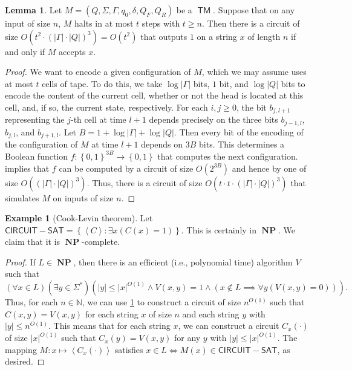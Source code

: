 \documentclass[10pt,letterpaper,cm]{nupset}
\theoremstyle{definition}
\newtheorem{exmp}[definition]{Example}
\theoremstyle{theorem}
\newtheorem{lemma}[definition]{Lemma}
\theoremstyle{remark}
\newcommand{\N}{\mathbb N}
\newcommand{\1}{\mathbf{1}}
\newcommand{\0}{\vec 0}
\DeclareMathOperator{\TM}{\mathsf{TM}}
\DeclareMathOperator{\NP}{\mathbf{NP}}
\begin{document}
\begin{lemma}\label{pl2}
Let $M= \left(Q, \Sigma, \Gamma, q_0, \delta, Q_F, Q_R\right)$ be a $\TM$. Suppose that on any input of size $n$, $M$ halts in at most $t$ steps with $t\geq n$. Then there is a circuit of size $O\left(t^2 \cdot (\left\lvert{\Gamma}\right\rvert\cdot \left\lvert{Q}\right\rvert)^3\right) = O\left(t^2\right)$ that  outputs $1$ on a  string $x$ of length $n$ if and only if $M$ accepts $x$.
\end{lemma}
\begin{proof}
We want to encode a given configuration of $M$, which we may assume uses at most $t$ cells of tape. To do this, we take $\log{\left\lvert{\Gamma}\right\rvert}$ bits, $1$ bit, and $\log{\left\lvert{Q}\right\rvert}$ bits to encode the content of the current cell, whether or not the head is located at this cell, and, if so, the current state, respectively.  For each $i,j\geq0$, the bit $b_{j, l+1}$ representing the $j$-th cell at time $l+1$ depends precisely on the three bits $b_{j-1, l}$, $b_{j, l}$, and $b_{j+1, l}$. Let $B= 1+ \log{\left\lvert{\Gamma}\right\rvert} +\log{\left\lvert{Q}\right\rvert}$. Then every bit of the encoding of the configuration of $M$ at time $l+1$ depends on $3B$ bits. This determines a Boolean function $f: \left\{0,1\right\}^{3B}\to \left\{0,1\right\}$ that computes the next configuration.  implies that $f$ can be computed by a circuit of size $O\left(2^{3B}\right)$ and hence by one of size $O\left(\left(\left\lvert{\Gamma}\right\rvert\cdot \left\lvert{Q}\right\rvert\right)^3\right)$. Thus, there is a circuit of size $O\left(t\cdot t\cdot  \left(\left\lvert{\Gamma}\right\rvert \cdot \left\lvert{Q}\right\rvert\right)^3\right)$ that simulates $M$ on inputs of size $n$.
\end{proof}

\begin{exmp}[Cook-Levin theorem]
Let  $\mathsf{CIRCUIT{-}SAT} = \left\{ \left\langle C \right\rangle : \exists x\left(C(x) = 1\right)\right\}$. This is certainly in $\NP$. We claim that it is $\NP$-complete.
\end{exmp}
\begin{proof}
If $L \in \NP$, then there is an efficient (i.e.,  polynomial time) algorithm $V$ such that $$\left(\forall x\in L\right)\left(\exists y\in \Sigma^{\ast}\right)\left(\left\lvert{y}\right\rvert\leq \left\lvert{x}\right\rvert^{O(1)} \land V\left(x,y\right) =1 \land \left(x\notin L \implies \forall y\left(V\left(x,y\right)=0\right)\right)\right).$$ Thus, for each $n\in \N$, we can use \cref{pl2} to construct a circuit of size $n^{O(1)}$ such that $C\left(x,y\right) = V\left(x,y\right)$ for each string $x$ of size $n$ and each string $y$ with $\left\lvert{y}\right\rvert\leq n^{O(1)}$. This means that for each string $x$, we can construct a circuit $C_x({\cdot})$ of size $\left\lvert{x}\right\rvert^{O(1)}$ such that $C_x(y) = V\left(x,y\right)$ for any $y$ with $\left\lvert{y}\right\rvert\leq \left\lvert{x}\right\rvert^{O(1)}$. The mapping $M: x\mapsto \left\langle C_x({\cdot}) \right\rangle$ satisfies $x\in L \iff M(x) \in \mathsf{CIRCUIT{-}SAT}$, as desired.  
\end{proof}
\end{document}
